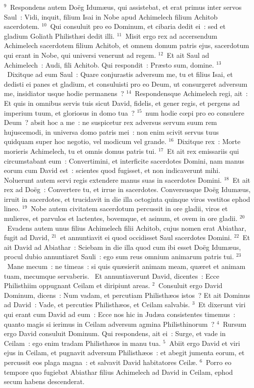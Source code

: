 ${}^{9}$~Respondens autem Do\"eg Idum\ae us, qui assistebat, et erat primus inter servos Saul~: Vidi, inquit, filium Isai in Nobe apud Achimelech filium Achitob sacerdotem.
${}^{10}$~Qui consuluit pro eo Dominum, et cibaria dedit ei~: sed et gladium Goliath Philisth\ae i dedit illi.
${}^{11}$~Misit ergo rex ad accersendum Achimelech sacerdotem filium Achitob, et omnem domum patris ejus, sacerdotum qui erant in Nobe, qui universi venerunt ad regem.
${}^{12}$~Et ait Saul ad Achimelech~: Audi, fili Achitob. Qui respondit~: Pr\ae sto sum, domine.
${}^{13}$~Dixitque ad eum Saul~: Quare conjurastis adversum me, tu et filius Isai, et dedisti ei panes et gladium, et consuluisti pro eo Deum, ut consurgeret adversum me, insidiator usque hodie permanens~?
${}^{14}$~Respondensque Achimelech regi, ait~: Et quis in omnibus servis tuis sicut David, fidelis, et gener regis, et pergens ad imperium tuum, et gloriosus in domo tua~?
${}^{15}$~num hodie cœpi pro eo consulere Deum~? absit hoc a me~: ne suspicetur rex adversus servum suum rem hujuscemodi, in universa domo patris mei~: non enim scivit servus tuus quidquam super hoc negotio, vel modicum vel grande.
${}^{16}$~Dixitque rex~: Morte morieris Achimelech, tu et omnis domus patris tui.
${}^{17}$~Et ait rex emissariis qui circumstabant eum~: Convertimini, et interficite sacerdotes Domini, nam manus eorum cum David est~: scientes quod fugisset, et non indicaverunt mihi. Noluerunt autem servi regis extendere manus suas in sacerdotes Domini.
${}^{18}$~Et ait rex ad Do\"eg~: Convertere tu, et irrue in sacerdotes. Conversusque Do\"eg Idum\ae us, irruit in sacerdotes, et trucidavit in die illa octoginta quinque viros vestitos ephod lineo.
${}^{19}$~Nobe autem civitatem sacerdotum percussit in ore gladii, viros et mulieres, et parvulos et lactentes, bovemque, et asinum, et ovem in ore gladii.
${}^{20}$~Evadens autem unus filius Achimelech filii Achitob, cujus nomen erat Abiathar, fugit ad David,
${}^{21}$~et annuntiavit ei quod occidisset Saul sacerdotes Domini.
${}^{22}$~Et ait David ad Abiathar~: Sciebam in die illa quod cum ibi esset Do\"eg Idum\ae us, procul dubio annuntiaret Sauli~: ego sum reus omnium animarum patris tui.
${}^{23}$~Mane mecum~: ne timeas~: si quis qu\ae sierit animam meam, qu\ae ret et animam tuam, mecumque servaberis.
~\lettrine[lines=10,image=true,loversize=0.05,lraise=-0.03]{E}{}t annuntiaverunt David, dicentes~: Ecce Philisthiim oppugnant Ceilam et diripiunt areas.
${}^{2}$~Consuluit ergo David Dominum, dicens~: Num vadam, et percutiam Philisth\ae os istos~? Et ait Dominus ad David~: Vade, et percuties Philisth\ae os, et Ceilam salvabis.
${}^{3}$~Et dixerunt viri qui erant cum David ad eum~: Ecce nos hic in Jud\ae a consistentes timemus~: quanto magis si ierimus in Ceilam adversum agmina Philisthinorum~?
${}^{4}$~Rursum ergo David consuluit Dominum. Qui respondens, ait ei~: Surge, et vade in Ceilam~: ego enim tradam Philisth\ae os in manu tua.
${}^{5}$~Abiit ergo David et viri ejus in Ceilam, et pugnavit adversum Philisth\ae os~: et abegit jumenta eorum, et percussit eos plaga magna~: et salvavit David habitatores Ceil\ae .
${}^{6}$~Porro eo tempore quo fugiebat Abiathar filius Achimelech ad David in Ceilam, ephod secum habens descenderat.


